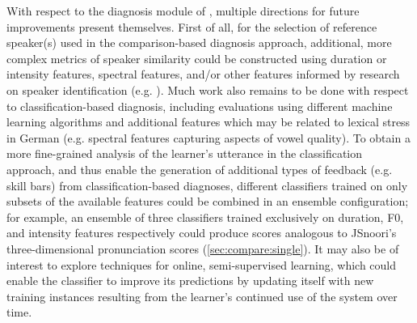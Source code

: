 	
	With respect to the diagnosis module of , multiple directions for future improvements present themselves. 
	First of all, for the selection of reference speaker(s) used in the comparison-based diagnosis approach, additional, more complex metrics of speaker similarity could be 
	constructed using duration or intensity features, spectral features, and/or other features informed by research on speaker identification (e.g. \cite{Shriberg2005}).
	Much work also remains to be done with respect to classification-based diagnosis, including evaluations using different machine learning algorithms and additional features which may be related to lexical stress in German (e.g. spectral features capturing aspects of vowel quality). To obtain a more fine-grained analysis of the learner's utterance in the classification approach, and thus enable the generation of additional types of feedback (e.g. skill bars) from classification-based diagnoses, different classifiers trained on only subsets of the available features could be combined in an ensemble configuration;
	for example, an ensemble of three classifiers trained exclusively on duration, F0, and intensity features respectively could produce scores analogous to JSnoori's three-dimensional pronunciation scores (\cref{sec:compare:single}).
	 It may also be of interest to explore techniques for online, semi-supervised learning, which could enable the classifier to improve its predictions by updating itself with new training instances resulting from the learner's continued use of the system over time.
	
